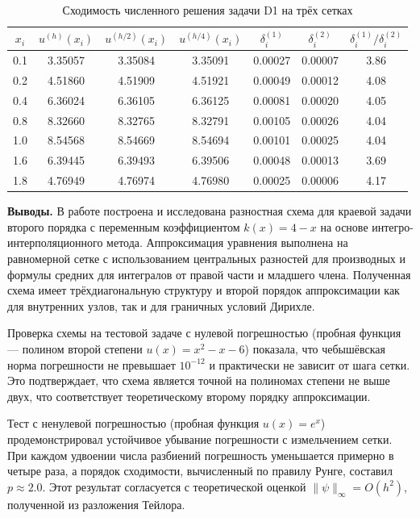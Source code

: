 \documentclass[a4paper,12pt]{article}
\begin{document}
	\begin{table}[H]
		\centering
		\caption{Сходимость численного решения задачи D1 на трёх сетках}
		\label{tab:convergence}
		\begin{tabular}{|c|c|c|c|c|c|c|}
			\hline
			$x_i$ & $u^{(h)}(x_i)$ & $u^{(h/2)}(x_i)$ & $u^{(h/4)}(x_i)$ & $\delta^{(1)}_i$ & $\delta^{(2)}_i$ & $\delta^{(1)}_i / \delta^{(2)}_i$ \\
			\hline
			0.1 & 3.35057 & 3.35084 & 3.35091 & 0.00027 & 0.00007 & 3.86 \\
			0.2 & 4.51860 & 4.51909 & 4.51921 & 0.00049 & 0.00012 & 4.08 \\
			0.4 & 6.36024 & 6.36105 & 6.36125 & 0.00081 & 0.00020 & 4.05 \\
			0.8 & 8.32660 & 8.32765 & 8.32791 & 0.00105 & 0.00026 & 4.04 \\
			1.0 & 8.54568 & 8.54669 & 8.54694 & 0.00101 & 0.00025 & 4.04 \\
			1.6 & 6.39445 & 6.39493 & 6.39506 & 0.00048 & 0.00013 & 3.69 \\
			1.8 & 4.76949 & 4.76974 & 4.76980 & 0.00025 & 0.00006 & 4.17 \\
			\hline
		\end{tabular}
	\end{table}
	
	\quad \textbf{Выводы.} В работе построена и исследована разностная схема для краевой задачи второго порядка с переменным коэффициентом $k(x) = 4 - x$ на основе интегро-интерполяционного метода. Аппроксимация уравнения выполнена на равномерной сетке с использованием центральных разностей для производных и формулы средних для интегралов от правой части и младшего члена. Полученная схема имеет трёхдиагональную структуру и второй порядок аппроксимации как для внутренних узлов, так и для граничных условий Дирихле.
	
	Проверка схемы на тестовой задаче с нулевой погрешностью (пробная функция --- полином второй степени $u(x) = x^2 - x - 6$) показала, что чебышёвская норма погрешности не превышает $10^{-12}$ и практически не зависит от шага сетки. Это подтверждает, что схема является точной на полиномах степени не выше двух, что соответствует теоретическому второму порядку аппроксимации.
	
	Тест с ненулевой погрешностью (пробная функция $u(x) = e^x$) продемонстрировал устойчивое убывание погрешности с измельчением сетки. При каждом удвоении числа разбиений погрешность уменьшается примерно в четыре раза, а порядок сходимости, вычисленный по правилу Рунге, составил $p \approx 2.0$. Этот результат согласуется с теоретической оценкой $\|\psi\|_\infty = O(h^2)$, полученной из разложения Тейлора.
	
\end{document}
